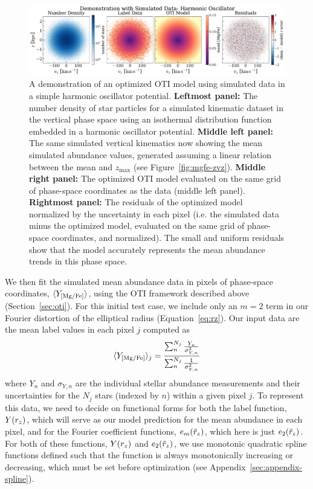 \begin{figure}[t!]
\begin{center}
\includegraphics[width=\textwidth]{sho-data-model.pdf}
\end{center}
\caption{%
A demonstration of an optimized OTI model using simulated data in a simple harmonic
oscillator potential.
\textbf{Leftmost panel:} The number density of star particles for a simulated kinematic
dataset in the vertical phase space using an isothermal distribution function embedded in a harmonic oscillator potential.
\textbf{Middle left panel:} The same simulated vertical kinematics now showing the mean
simulated  abundance values, generated assuming a linear relation between
the mean  and $z_{\textrm{max}}$ (see Figure~\ref{fig:mgfe-zvz}).
\textbf{Middle right panel:} The optimized OTI model evaluated on the same grid of
phase-space coordinates as the data (middle left panel).
\textbf{Rightmost panel:} The residuals of the optimized model normalized by the
uncertainty in each pixel (i.e. the simulated data minus the optimized model, evaluated
on the same grid of phase-space coordinates, and normalized).
The small and uniform residuals show that the model accurately represents the mean
abundance trends in this phase space.
\label{fig:sho-data-model}
}
\end{figure}

We then fit the simulated mean abundance data in pixels of phase-space coordinates,
$\langle Y_{{[\mathrm{Mg}/\mathrm{Fe}]}} \rangle$, using the OTI framework described above
(Section~\ref{sec:oti}).
For this initial test case, we include only an $m=2$ term in our Fourier distortion of
the elliptical radius (Equation~\ref{eq:rz}).
Our input data are the mean label values in each pixel $j$ computed as
\begin{equation}
    \langle Y_{{[\mathrm{Mg}/\mathrm{Fe}]}} \rangle_j =
        \frac{\sum_n^{N_j} \frac{Y_n}{\sigma_{Y,n}^2}}{\sum_n^{N_j} \frac{1}{\sigma_{Y,n}^2}} \label{eq:mean-abun}
\end{equation}
where $Y_n$ and $\sigma_{Y, n}$ are the individual stellar abundance measurements and
their uncertainties for the $N_j$ stars (indexed by $n$) within a given pixel $j$.
To represent this data, we need to decide on functional forms for both the label
function, $Y(r_z)$, which will serve as our model prediction for the mean abundance in
each pixel, and for the Fourier coefficient functions, $e_m(\tilde{r}_z)$, which here is just
$e_2(\tilde{r}_z)$.
For both of these functions, $Y(r_z)$ and $e_2(\tilde{r}_z)$, we use monotonic quadratic spline
functions defined such that the function is always monotonically increasing or
decreasing, which must be set before optimization (see
Appendix~\ref{sec:appendix-spline}).

